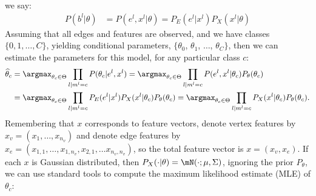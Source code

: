 we say:
\begin{align}
	P(b^l | \theta) &= P(e^l, x^l | \theta) = P_E(e^l | x^l) P_X(x^l | \theta) 
\end{align}
Assuming that all edges and features are observed, and we have classes $\{0,1,\ldots,C\}$, yielding conditional parameters, $\{\theta_0$, $\theta_1$, $\ldots$, $\theta_C\}$, then we can estimate the parameters for this model, for any particular class $c$:
\begin{align}
	\widehat{\theta}_c 	&= \argmax_{\theta_c \in \Theta} \prod_{l | m^l=c} P(\theta_c | e^l, x^l) %
			= \argmax_{\theta_c \in \Theta} \prod_{l | m^l=c} P(e^l, x^l | \theta_c) P_{\theta}(\theta_c) \nonumber \\
			&= \argmax_{\theta_c \in \Theta} \prod_{l | m^l=c} P_E(e^l | x^l) P_X(x^l | \theta_c) P_{\theta}(\theta_c) %
			= \argmax_{\theta_c \in \Theta} \prod_{l | m^l=c}  P_X(x^l | \theta_c) P_{\theta}(\theta_c). 
\end{align}
Remembering that $x$ corresponds to feature vectors, denote vertex features by $x_v=(x_1, \ldots, x_{n_v})$ and denote edge features by $x_e=(x_{1,1}, \ldots, x_{1,n_v}, x_{2,1}, \ldots x_{n_v,n_v})$, so the total feature vector is $x=(x_v, x_e)$. %
If each $x$ is Gaussian distributed, then $P_X(\cdot | \theta)=\mN(\cdot; \mu,\Sigma)$, ignoring the prior $P_{\theta}$, we can use standard tools to compute the maximum likelihood estimate (MLE) of $\theta_c$: %
